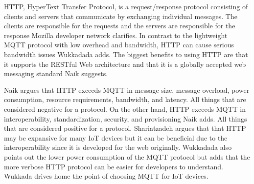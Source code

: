 HTTP, HyperText Transfer Protocol, is a request/response protocol consisting of clients and servers that communicate by exchanging individual messages. 
The clients are responsible for the requests and the servers are responsible for the response Mozilla developer network clarifies. \cite{HTTP2021} 
In contrast to the lightweight MQTT protocol with low overhead and bandwidth, HTTP can cause serious bandwidth issues Wukkadada adds. \cite{Wukkadada2018}
The biggest benefits to using HTTP are that it supports the RESTful Web architecture and that it is a globally accepted web messaging standard Naik suggests. \cite{Naik2017} 

Naik argues that HTTP exceeds MQTT in message size, message overload, power consumption, resource requirements, bandwidth, and latency. 
All things that are considered negative for a protocol.
On the other hand, HTTP exceeds MQTT in interoperability, standardization, security, and provisioning Naik adds.\cite{Naik2017}
All things that are considered positive for a protocol.
Shariatzadeh argues that that HTTP may be expansive for many IoT devices but it can be beneficial due to the interoperability since it is developed for the web originally.\cite{Shariatzadeh2016}
Wukkadada also points out the lower power consumption of the MQTT protocol but adds that the more verbose HTTP protocol can be easier for developers to understand.
Wukkada drives home the point of choosing MQTT for IoT devices.\cite{Wukkadada2018}
